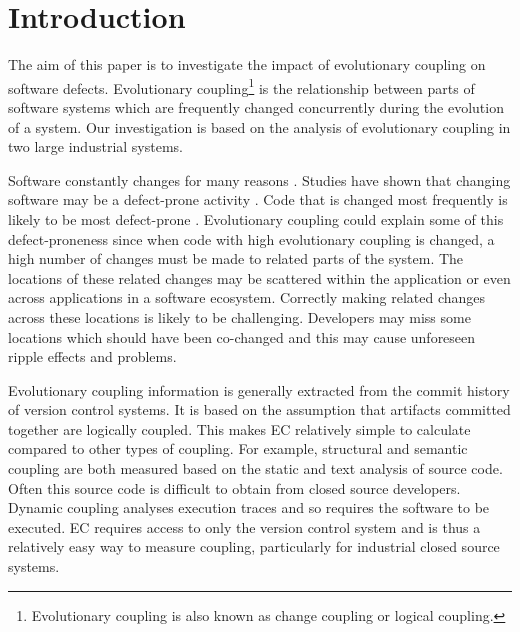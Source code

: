 \documentclass[times]{smrauth}
\begin{document}


\maketitle

	\section{Introduction}

The aim of this paper is to investigate the impact of evolutionary coupling on software defects. Evolutionary coupling\footnote{Evolutionary coupling is also known as change coupling or logical coupling.} is the relationship between parts of software systems which are frequently changed concurrently during the evolution of a system. Our investigation is based on the analysis of evolutionary coupling in two large industrial systems.

Software  constantly changes for many reasons \cite{lehman1980programs} \cite{bennett2000software} \cite{mens2008introduction} \cite{DBLP:journals/ercim/JV12}. Studies have shown that changing software may be a defect-prone activity \cite{sliwerski2005changes} \cite{moser2008comparative} \cite{mostFreqChangesRef1} \cite{graves2000predicting}. Code that is changed most frequently is likely to be most defect-prone \cite{nagappan2005use} \cite{mostFreqChangesRef1} \cite{mostFreqChangesRef2} \cite{mostFreqChangesRef3}. Evolutionary coupling could explain some of this defect-proneness since when code with high evolutionary coupling is changed, a high number of changes must be made to related parts of the system. The locations of these related changes may be scattered within the application or even across applications in a software ecosystem. Correctly making related changes across these locations is likely to be challenging. Developers may miss some locations which should have been co-changed and this may cause unforeseen ripple effects and problems.

Evolutionary coupling information is generally extracted from the commit history of version control systems. It is based on the assumption that artifacts committed together are logically coupled. This makes EC relatively simple to calculate compared to other types of coupling. For example, structural \cite{briand1999unified} and semantic \cite{poshyvanyk2009using} coupling are both measured based on the static and text analysis of source code. Often this source code is difficult to obtain from closed source developers. Dynamic coupling \cite{arisholm2004dynamic} analyses execution traces and so requires the software to be executed. EC requires access to only the version control system and is thus a relatively easy way to measure coupling, particularly for industrial closed source systems.
\end{document}
